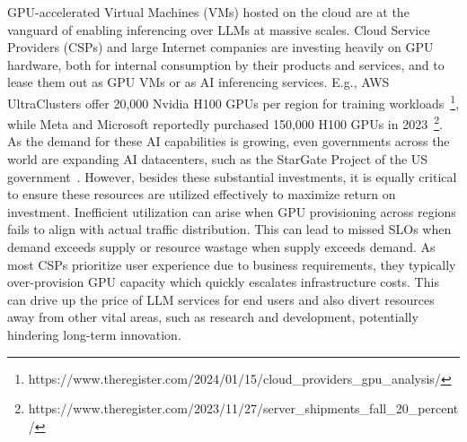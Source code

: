 GPU-accelerated Virtual Machines (VMs) hosted on the cloud are at the vanguard of enabling inferencing over LLMs at massive scales. Cloud Service Providers (CSPs) and large Internet companies are investing heavily on GPU hardware, both for internal consumption by their products and services, and to lease them out as GPU VMs or as AI inferencing services. E.g., AWS UltraClusters offer 20,000 Nvidia H100 GPUs per region for training workloads~\footnote{https://www.theregister.com/2024/01/15/cloud\_providers\_gpu\_analysis/}, while Meta and Microsoft reportedly purchased 150,000 H100 GPUs in 2023~\footnote{https://www.theregister.com/2023/11/27/server\_shipments\_fall\_20\_percent/}. 
As the demand for these AI capabilities is growing, even governments across the world are expanding AI datacenters, such as the StarGate Project of the US government~\cite{stargate}.
However, 
besides these substantial investments,
it is equally critical to ensure these resources are utilized effectively to maximize return on investment. Inefficient utilization can arise when GPU provisioning across regions fails to align with actual traffic distribution. This can lead to missed SLOs when demand exceeds supply or resource wastage when supply exceeds demand. As most CSPs prioritize user experience due to business requirements, they typically over-provision GPU capacity which quickly escalates infrastructure costs. This can drive up the price of LLM services for end users and also divert resources away from other vital areas, such as research and development, potentially hindering long-term innovation. 

